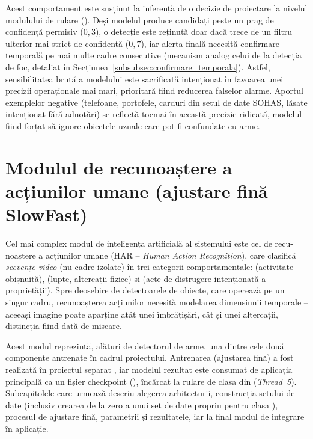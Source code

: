 \documentclass[../../main.tex]{subfiles}
\begin{document}
Acest comportament este susținut la inferență de o decizie de proiectare la nivelul modulului de rulare (). Deși modelul produce candidați peste un prag de confidență permisiv ($0{,}3$), o detecție este reținută doar dacă trece de un filtru ulterior mai strict de confidență ($0{,}7$), iar alerta finală necesită confirmare temporală pe mai multe cadre consecutive (mecanism analog celui de la detecția de foc, detaliat în Secțiunea~\ref{subsubsec:confirmare_temporala}). Astfel, sensibilitatea brută a modelului este sacrificată intenționat în favoarea unei precizii operaționale mai mari, prioritară fiind reducerea falselor alarme. Aportul exemplelor negative (telefoane, portofele, carduri din setul de date SOHAS, lăsate intenționat fără adnotări) se reflectă tocmai în această precizie ridicată, modelul fiind forțat să ignore obiectele uzuale care pot fi confundate cu arme.

\section{Modulul de recunoaștere a acțiunilor umane (ajustare fină SlowFast)}
\label{sec:modul_actiuni}

Cel mai complex modul de inteligență artificială al sistemului este cel de recu-noaștere a
acțiunilor umane (HAR -- \textit{Human Action Recognition}), care clasifică \textit{secvențe
video} (nu cadre izolate) în trei categorii comportamentale:  (activitate
obișnuită),  (lupte, altercații fizice) și  (acte de
distrugere intenționată a proprietății). Spre deosebire de detectoarele de obiecte, care
operează pe un singur cadru, recunoașterea acțiunilor necesită modelarea dimensiunii temporale
-- aceeași imagine poate aparține atât unei îmbrățișări, cât și unei altercații, distincția
fiind dată de mișcare.

Acest modul reprezintă, alături de detectorul de arme, una dintre cele două componente
antrenate în cadrul proiectului. Antrenarea (ajustarea fină) a fost realizată în proiectul separat
, iar modelul rezultat este consumat de aplicația principală ca un
fișier checkpoint (), încărcat la rulare de clasa
 din  (\textit{Thread~5}).
Subcapitolele care urmează descriu alegerea arhitecturii, construcția setului de date (inclusiv
crearea de la zero a unui set de date propriu pentru clasa ), procesul de
ajustare fină, parametrii și rezultatele, iar la final modul de integrare în aplicație.
\end{document}
